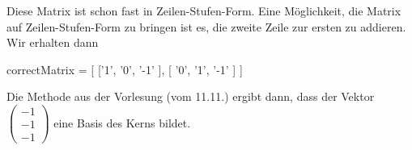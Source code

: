 \documentclass{ximera}
\begin{document}
\begin{question}
Diese Matrix ist schon fast in Zeilen-Stufen-Form. Eine Möglichkeit, die Matrix auf Zeilen-Stufen-Form zu bringen ist es, die zweite Zeile zur ersten zu addieren. Wir erhalten dann
\begin{matrix-answer}
correctMatrix = [ ['1', '0', '-1' ], [ '0', '1', '-1' ] ]
\end{matrix-answer}
\end{question}


Die Methode aus der Vorlesung (vom 11.11.) ergibt dann, dass der Vektor $\left(\begin{array}{c}
-1\\-1\\-1  \end{array}\right)$ eine Basis des Kerns bildet.
\end{document}
